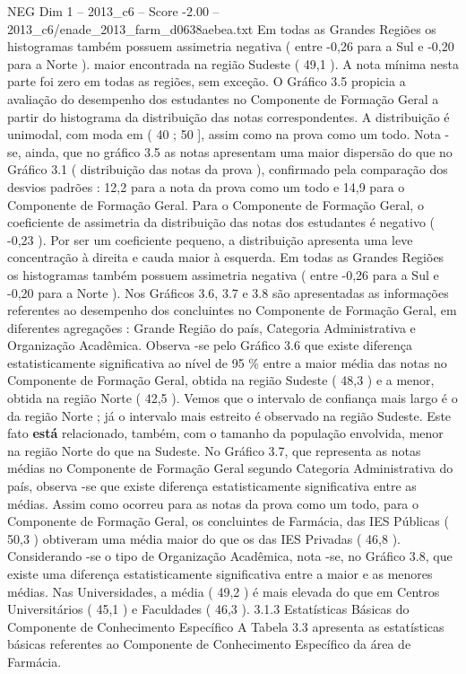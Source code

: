 \begin{textsample}{NEG Dim 1 – 2013\_c6 – Score -2.00 – 2013\_c6/enade\_2013\_farm\_d0638aebea.txt}
Em todas as Grandes Regiões os histogramas também possuem assimetria negativa ( entre -0,26 para a Sul e -0,20 para a Norte ). maior encontrada na região Sudeste ( 49,1 ).
A nota mínima nesta parte foi zero em todas as regiões, sem exceção.
O Gráfico 3.5 propicia a avaliação do desempenho dos estudantes no Componente de Formação Geral a partir do histograma da distribuição das notas correspondentes.
A distribuição é unimodal, com moda em ( 40 ; 50 ], assim como na prova como um todo.
Nota -se, ainda, que no gráfico 3.5 as notas apresentam uma maior dispersão do que no Gráfico 3.1 ( distribuição das notas da prova ), confirmado pela comparação dos desvios padrões : 12,2 para a nota da prova como um todo e 14,9 para o Componente de Formação Geral.
Para o Componente de Formação Geral, o coeficiente de assimetria da distribuição das notas dos estudantes é negativo ( -0,23 ).
Por ser um coeficiente pequeno, a distribuição apresenta uma leve concentração à direita e cauda maior à esquerda.
Em todas as Grandes Regiões os histogramas também possuem assimetria negativa ( entre -0,26 para a Sul e -0,20 para a Norte ).
Nos Gráficos 3.6, 3.7 e 3.8 são apresentadas as informações referentes ao desempenho dos concluintes no Componente de Formação Geral, em diferentes agregações : Grande Região do país, Categoria Administrativa e Organização Acadêmica.
Observa -se pelo Gráfico 3.6 que existe diferença estatisticamente significativa ao nível de 95 \% entre a maior média das notas no Componente de Formação Geral, obtida na região Sudeste ( 48,3 ) e a menor, obtida na região Norte ( 42,5 ).
Vemos que o intervalo de confiança mais largo é o da região Norte ; já o intervalo mais estreito é observado na região Sudeste.
Este fato \textbf{está} relacionado, também, com o tamanho da população envolvida, menor na região Norte do que na Sudeste.
No Gráfico 3.7, que representa as notas médias no Componente de Formação Geral segundo Categoria Administrativa do país, observa -se que existe diferença estatisticamente significativa entre as médias.
Assim como ocorreu para as notas da prova como um todo, para o Componente de Formação Geral, os concluintes de Farmácia, das IES Públicas ( 50,3 ) obtiveram uma média maior do que os das IES Privadas ( 46,8 ).
Considerando -se o tipo de Organização Acadêmica, nota -se, no Gráfico 3.8, que existe uma diferença estatisticamente significativa entre a maior e as menores médias.
Nas Universidades, a média ( 49,2 ) é mais elevada do que em Centros Universitários ( 45,1 ) e Faculdades ( 46,3 ). 3.1.3 Estatísticas Básicas do Componente de Conhecimento Específico A Tabela 3.3 apresenta as estatísticas básicas referentes ao Componente de Conhecimento Específico da área de Farmácia.

\end{textsample}
